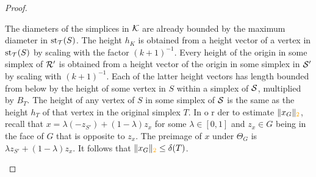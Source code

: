 \documentclass[10pt,letterpaper]{article}
\newcommand\cye[1]{%
  \protect\leavevmode
  \begingroup
    \color{red!35!yellow}%
    #1%
  \endgroup
}
\begin{document}
\begin{proof}
\begin{itemize}
        The diameters of the simplices in ${\mathcal K}$ are already bounded by the maximum diameter in $\operatorname{st}_{{\mathcal T}}(S)$.
        The height $h_{K}$ is obtained from a height vector of a vertex in $\operatorname{st}_{{\mathcal T}}(S)$ by scaling with the factor $(k+1)^{-1}$.
        Every height of the origin in some simplex of ${\mathcal R}'$ is obtained from a height vector of the origin in some simplex in ${\mathcal S}'$
        by scaling with $(k+1)^{-1}$. Each of the latter height vectors has length bounded from below by the height of some vertex in $S$ within a simplex of ${\mathcal S}$, multiplied by $B_{T}$. The height of any vertex of $S$ in some simplex of ${\mathcal S}$ is the same as the height $h_T$ of that vertex in the original simplex $T$. 
        In o\cye{r}der to estimate $\|x_{G}\|_{\cye{2}}$, recall that $x = \lambda (-z_{S'}) + (1-\lambda) z_{x}$ for some $\lambda \in [0,1]$ and $z_{x} \in G$
        being in the face of $G$ that is opposite to $z_{x}$. The preimage of $x$ under $\Theta_{{G}}$ is $\lambda z_{S'} + (1-\lambda) z_{x}$. 
        It follows that $\|x_{G}\|_{\cye{2}} \leq \diam(T)$. 
        

\end{itemize}
\end{proof}
\end{document}

